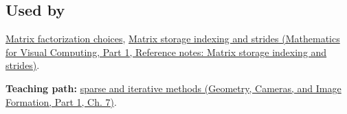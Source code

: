 \subsection{Used by}\label{appendix-67c87a3d9e94-used-by}

\hypertarget{appendix-67c87a3d9e94-used-by}{}

\hyperref[appendix-221a483bec2d]{Matrix factorization choices}, \href{../02-Mathematics-for-Visual-Computing-P01/main.pdf\#appendix-ffdc1d4e5350}{Matrix storage indexing and strides (Mathematics for Visual Computing, Part 1, Reference notes: Matrix storage indexing and strides)}.

\textbf{Teaching path:} \href{../03-Geometry-Cameras-and-Image-Formation-P01/main.pdf\#02-foundations-ii-ch038-sparse-problems-change-the-economics-of-solving}{sparse and iterative methods (Geometry, Cameras, and Image Formation, Part 1, Ch. 7)}.
